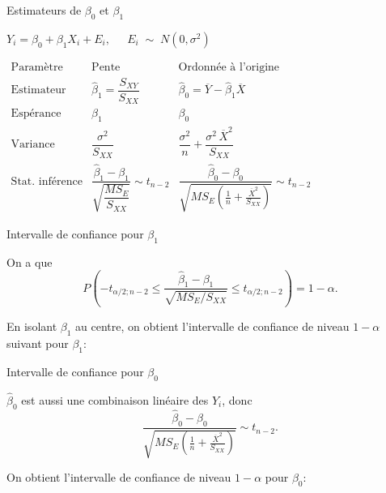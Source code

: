 \documentclass{BeamerTemplate}
\begin{document}
\begin{frame}[t]{Estimateurs de $\beta_0$ et $\beta_1$}

\centerline{$Y_i=\beta_0+\beta_1X_i+E_i,\ \ \quad E_i\;\sim\;N(0,\sigma^2)$}

\bigskip

{\small

{\renewcommand{\arraystretch}{2}
$\begin{array}{c|c|c}
\text{Paramètre}&\text{Pente}&\text{Ordonnée à l'origine}\\\hline
\text{Estimateur}&\hat{\beta}_1%
=\dfrac{S_{XY}}{S_{XX}}%
&\hat{\beta}_0=\overline{Y}-\hat{\beta}_1\overline{X}\\\hline
\text{Espérance}&\beta_1&\beta_0\\\hline
\text{Variance}&\dfrac{\sigma^2}{S_{XX}}&\dfrac{\sigma^2}{n}+\dfrac{\sigma^2\,\overline X^2}{S_{XX}}\\[2mm]\hline
\text{Stat. inférence}& \dfrac{\hat{\beta}_1-\beta_1}{\sqrt{\dfrac{MS_E}{S_{XX}}}}\sim t_{n-2}& \dfrac{\hat{\beta}_0-\beta_0}{\sqrt{MS_E\left(\frac{1}{n}+\frac{\overline{X}^2}{S_{XX}}\right)}}\sim t_{n-2}
\end{array}$
}

}
\end{frame}

\begin{frame}[t]{Intervalle de confiance pour $\beta_1$}

On a que
$$P\left(-t_{\alpha/2;n-2}\le\frac{\hat{\beta}_1-\beta_1}{\sqrt{MS_E/S_{XX}}}\le t_{\alpha/2;n-2}\right)=1-\alpha.$$

En isolant $\beta_1$ au centre, on obtient l'intervalle de confiance de niveau $1-\alpha$  suivant pour
$\beta_1$:
{}
\end{frame}


\begin{frame}[t]{Intervalle de confiance pour $\beta_0$}

$\hat{\beta}_0$ est aussi une combinaison linéaire des $Y_i$, donc
$$
\frac{\hat{\beta}_0-\beta_0}{\sqrt{MS_E\left(\frac{1}{n}+\frac{\overline{X}^2}{S_{XX}}\right)}}\sim t_{n-2}.
$$

On obtient l'intervalle de confiance de niveau $1-\alpha$   pour
$\beta_0$:

{}
\end{frame}
\end{document}
